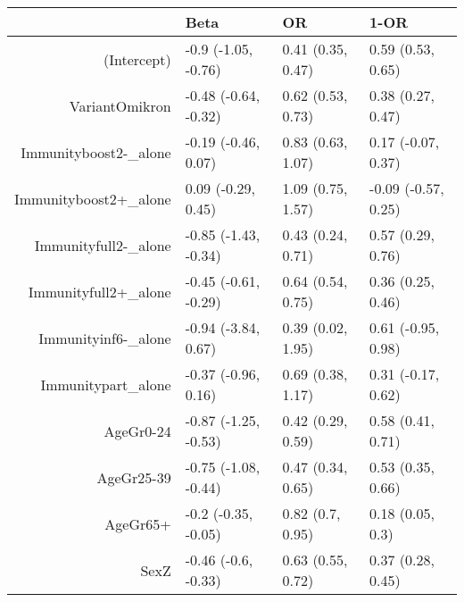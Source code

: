 \begin{table}[ht]
\centering
\begin{tabular}{rlll}
  \hline
 & Beta & OR & 1-OR \\ 
  \hline
(Intercept) & -0.9 (-1.05, -0.76) & 0.41 (0.35, 0.47) & 0.59 (0.53, 0.65) \\ 
  VariantOmikron & -0.48 (-0.64, -0.32) & 0.62 (0.53, 0.73) & 0.38 (0.27, 0.47) \\ 
  Immunityboost2-\_alone & -0.19 (-0.46, 0.07) & 0.83 (0.63, 1.07) & 0.17 (-0.07, 0.37) \\ 
  Immunityboost2+\_alone & 0.09 (-0.29, 0.45) & 1.09 (0.75, 1.57) & -0.09 (-0.57, 0.25) \\ 
  Immunityfull2-\_alone & -0.85 (-1.43, -0.34) & 0.43 (0.24, 0.71) & 0.57 (0.29, 0.76) \\ 
  Immunityfull2+\_alone & -0.45 (-0.61, -0.29) & 0.64 (0.54, 0.75) & 0.36 (0.25, 0.46) \\ 
  Immunityinf6-\_alone & -0.94 (-3.84, 0.67) & 0.39 (0.02, 1.95) & 0.61 (-0.95, 0.98) \\ 
  Immunitypart\_alone & -0.37 (-0.96, 0.16) & 0.69 (0.38, 1.17) & 0.31 (-0.17, 0.62) \\ 
  AgeGr0-24 & -0.87 (-1.25, -0.53) & 0.42 (0.29, 0.59) & 0.58 (0.41, 0.71) \\ 
  AgeGr25-39 & -0.75 (-1.08, -0.44) & 0.47 (0.34, 0.65) & 0.53 (0.35, 0.66) \\ 
  AgeGr65+ & -0.2 (-0.35, -0.05) & 0.82 (0.7, 0.95) & 0.18 (0.05, 0.3) \\ 
  SexZ & -0.46 (-0.6, -0.33) & 0.63 (0.55, 0.72) & 0.37 (0.28, 0.45) \\ 
   \hline
\end{tabular}
\end{table}
